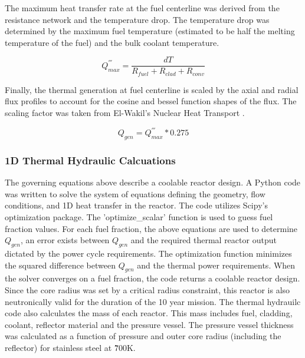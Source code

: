 The maximum heat transfer rate at the fuel centerline was derived from the
resistance network and the temperature drop. The temperature drop was determined
by the maximum fuel temperature (estimated to be half the melting temperature of
the fuel) and the bulk coolant temperature.

\begin{equation}
    Q^{'''}_{max} = \frac{dT}{R_{fuel} + R_{clad} + R_{conv}}
\end{equation}

Finally, the thermal generation at fuel centerline is scaled by the axial and
radial flux profiles to account for the cosine and bessel function shapes of the
flux. The scaling factor was taken from El-Wakil's Nuclear Heat Transport
\citep{heat_trans_wakil}.

\begin{equation}
    Q_{gen} = Q^{'''}_{max} * 0.275
\end{equation}

\subsubsection{1D Thermal Hydraulic Calcuations}

    The governing equations above describe a coolable
reactor design. A Python code was written to solve the system of equations
defining the geometry, flow conditions, and 1D heat transfer in the reactor. The
code utilizes Scipy's optimization package. The 'optimize\_scalar' function is
used to guess fuel fraction values. For each fuel fraction, the above equations
are used to determine $Q_{gen}$, an error exists between $Q_{gen}$ and the
required thermal reactor output dictated by the power cycle requirements. The
optimization function minimizes the squared difference between $Q_{gen}$ and the
thermal power requirements. When the solver converges on a fuel fraction, the
code returns a coolable reactor design. Since the core radius was set by a
critical radius constraint, this reactor is also neutronically valid for the
duration of the 10 year mission.
    The thermal hydrauilc code also calculates the mass of each reactor. This
mass includes fuel, cladding, coolant, reflector material and the pressure
vessel. The pressure vessel thickness was calculated as a function of pressure
and outer core radius (including the reflector) for stainless steel at \~700K.

